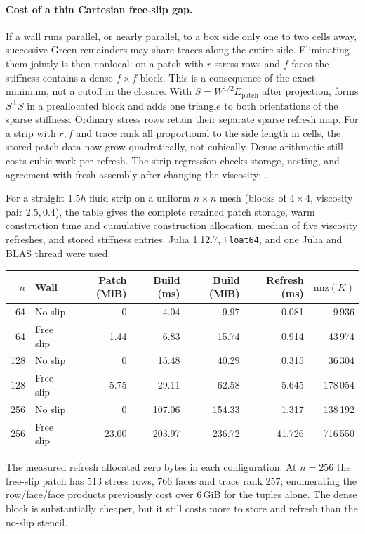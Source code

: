 \paragraph{Cost of a thin Cartesian free-slip gap.}
If a wall runs parallel, or nearly parallel, to a box side only one to
two cells away, successive Green remainders may share traces along the
entire side. Eliminating them jointly is then nonlocal: on a patch with
$r$ stress rows and $f$ faces the stiffness contains a dense $f\times f$
block. This is a consequence of the exact minimum, not a cutoff in the
closure. With $S=W^{1/2}E_{\mathrm{patch}}$ after projection,
forms $S^\top S$ in a preallocated block and adds one triangle to both
orientations of the sparse stiffness. Ordinary stress rows retain their
separate sparse refresh map. For a strip with $r,f$ and trace rank all
proportional to the side length in cells, the stored patch data now grow
quadratically, not cubically. Dense arithmetic still costs cubic work
per refresh. The strip regression checks storage, nesting, and agreement
with fresh assembly after changing the viscosity:
.

For a straight $1.5h$ fluid strip on a uniform $n\times n$ mesh (blocks of
$4\times4$, viscosity pair $2.5,0.4$), the table gives the complete retained
patch storage, warm construction time and cumulative construction allocation,
median of five viscosity refreshes, and stored stiffness entries. Julia
1.12.7, \texttt{Float64}, and one Julia and BLAS thread were used.
\begin{center}
\begin{tabular}{rlrrrrr}
\toprule
$n$ & Wall & Patch (MiB) & Build (ms) & Build (MiB) & Refresh (ms) & $\mathrm{nnz}(K)$ \\
\midrule
64  & No slip   & 0     & 4.04   & 9.97   & 0.081 & 9\,936 \\
64  & Free slip & 1.44  & 6.83   & 15.74  & 0.914 & 43\,974 \\
128 & No slip   & 0     & 15.48  & 40.29  & 0.315 & 36\,304 \\
128 & Free slip & 5.75  & 29.11  & 62.58  & 5.645 & 178\,054 \\
256 & No slip   & 0     & 107.06 & 154.33 & 1.317 & 138\,192 \\
256 & Free slip & 23.00 & 203.97 & 236.72 & 41.726 & 716\,550 \\
\bottomrule
\end{tabular}
\end{center}
The measured refresh allocated zero bytes in each configuration. At $n=256$ the
free-slip patch has 513 stress rows, 766 faces and trace rank 257;
enumerating the row/face/face products previously cost over 6\,GiB for
the tuples alone. The dense block is substantially cheaper, but it still
costs more to store and refresh than the no-slip stencil.

